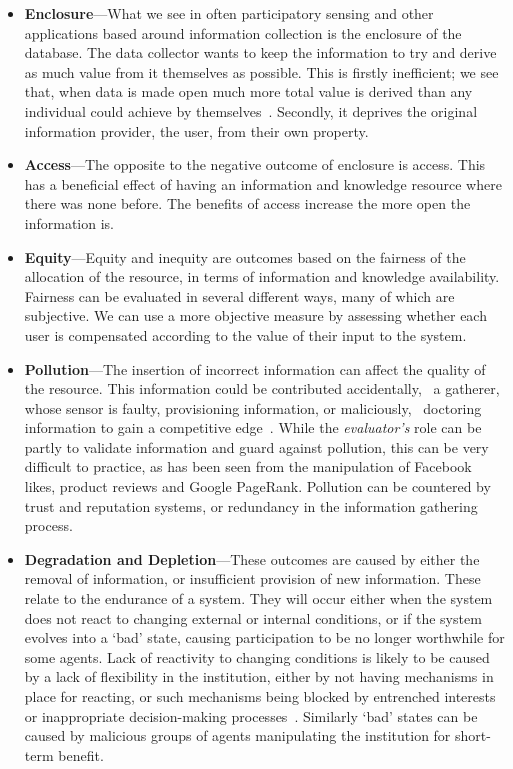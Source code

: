\begin{itemize}

\item \textbf{Enclosure}---What we see in often participatory sensing and other applications based around information collection is the enclosure of the database. 
The data collector wants to keep the information to try and derive as much value from it themselves as possible. 
This is firstly inefficient; we see that, when data is made open much more total value is derived than any individual could achieve by themselves~\citep{Shadbolt2012}. 
Secondly, it deprives the original information provider, the user, from their own property. 

\item \textbf{Access}---The opposite to the negative outcome of enclosure is access. 
This has a beneficial effect of having an information and knowledge resource where there was none before. 
The benefits of access increase the more open the information is.

\item \textbf{Equity}---Equity and inequity are outcomes based on the fairness of the allocation of the resource, in terms of information and knowledge availability. Fairness can be evaluated in several different ways, many of which are subjective. We can use a more objective measure by assessing whether each user is compensated according to the value of their input to the system. 


\item \textbf{Pollution}---The insertion of incorrect information can affect the quality of the resource. 
This information could be contributed accidentally, \eg\ a gatherer, whose sensor is faulty, provisioning information, or maliciously, \eg\ doctoring information to gain a competitive edge~\citep{Oreskes2010}. While the \emph{evaluator's} role can be partly to validate information and guard against pollution, this can be very difficult to practice, as has been seen from the manipulation of Facebook likes, product reviews and Google PageRank. %
Pollution can be countered by trust and reputation systems, or redundancy in the information gathering process.

\item \textbf{Degradation and Depletion}---These outcomes are caused by either the removal of information, or insufficient provision of new information. 
These relate to the endurance of a system. They will occur either when the system does not react to changing external or internal conditions,  or if the system evolves into a `bad' state, causing participation to be no longer worthwhile for some agents. 
Lack of reactivity to changing conditions is likely to be caused by a lack of flexibility in the institution, either by not having mechanisms in place for reacting, or such mechanisms being blocked by entrenched interests or inappropriate decision-making processes~\citep{North1990}. 
Similarly `bad' states can be caused by malicious groups of agents manipulating the institution for short-term benefit.


\end{itemize}
